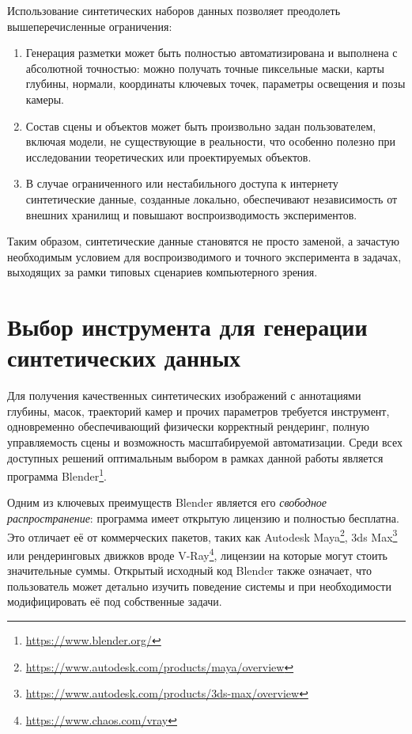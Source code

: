 Использование синтетических наборов данных позволяет преодолеть
вышеперечисленные ограничения:
\begin{enumerate}
  \item Генерация разметки может быть полностью автоматизирована и выполнена с
  абсолютной точностью: можно получать точные пиксельные маски, карты глубины,
  нормали, координаты ключевых точек, параметры освещения и позы камеры.
  \item Состав сцены и объектов может быть произвольно задан пользователем,
  включая модели, не существующие в реальности, что особенно полезно при
  исследовании теоретических или проектируемых объектов.
  \item В случае ограниченного или нестабильного доступа к интернету
  синтетические данные, созданные локально, обеспечивают независимость от
  внешних хранилищ и повышают воспроизводимость экспериментов.
\end{enumerate}

Таким образом, синтетические данные становятся не просто заменой, а зачастую
необходимым условием для воспроизводимого и точного эксперимента в задачах,
выходящих за рамки типовых сценариев компьютерного зрения.

\section{Выбор инструмента для генерации синтетических данных}

Для получения качественных синтетических изображений с аннотациями глубины,
масок, траекторий камер и прочих параметров требуется инструмент, одновременно
обеспечивающий физически корректный рендеринг, полную управляемость сцены и
возможность масштабируемой автоматизации. Среди всех доступных решений
оптимальным выбором в рамках данной работы является программа
Blender\footnote{\url{https://www.blender.org/}}.

Одним из ключевых преимуществ Blender является его \emph{свободное распространение}:
программа имеет открытую лицензию и полностью бесплатна. Это отличает её от
коммерческих пакетов, таких как Autodesk
Maya\footnote{\url{https://www.autodesk.com/products/maya/overview}}, 3ds
Max\footnote{\url{https://www.autodesk.com/products/3ds-max/overview}} или
рендеринговых движков вроде V-Ray\footnote{\url{https://www.chaos.com/vray}},
лицензии на которые могут стоить значительные суммы.  Открытый исходный код
Blender также означает, что пользователь может детально изучить поведение
системы и при необходимости модифицировать её под собственные задачи.

